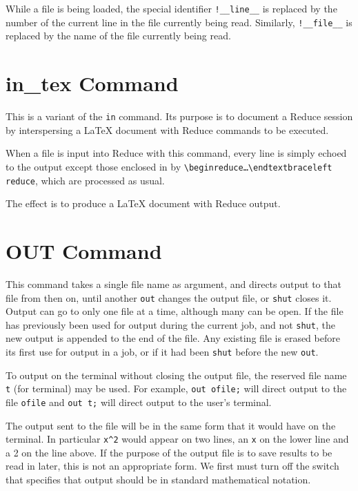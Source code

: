 While a file is being loaded, the special identifier
\texttt{!\_\_line\_\_}
is replaced by the number of the current line in the file currently
being read.
Similarly, \texttt{!\_\_file\_\_}
is replaced by the name of the file currently
being read.

\section{in\_tex Command}
\hypertarget{command:IN_TEX}{}

This is a variant of the \texttt{in} command. Its purpose is to document a Reduce session
by interspersing a \LaTeX{} document with Reduce commands to be executed.

When a file is input into Reduce with this command, every line is simply echoed to the output
except those enclosed in by
\texttt{\textbackslash begin\textbraceleft reduce\textbraceright\ldots\textbackslash endtextbraceleft reduce\textbraceright},
which are processed as usual.

The effect is to produce a \LaTeX{} document with Reduce output.


\section{OUT Command}
\hypertarget{command:OUT}{}
This command takes a single file name as argument, and directs output to
that file from then on, until another \texttt{out} changes the output file,
or \texttt{shut} closes it.  Output can go to only one file at a time,
although many can be open.  If the file has previously been used for
output during the current job, and not \texttt{shut}, the new
output is appended to the end of the file.  Any existing file is erased
before its first use for output in a job, or if it had been \texttt{shut}
before the new \texttt{out}.

To output on the terminal without closing the output file, the reserved
file name \texttt{t} (for terminal) may be used.  For example,
\texttt{out ofile;} will direct output to the file \texttt{ofile} and
\texttt{out t;} will direct output to the user's terminal.

The output sent to the file will be in the same form that it would have on
the terminal.  In particular \texttt{x\textasciicircum 2} would appear 
on two lines, an
\texttt{x} on the lower line and a 2 on the line above.  If the purpose of the
output file is to save results to be read in later, this is not an
appropriate form.  We first must turn off the  switch that
specifies that output should be in standard mathematical notation.

